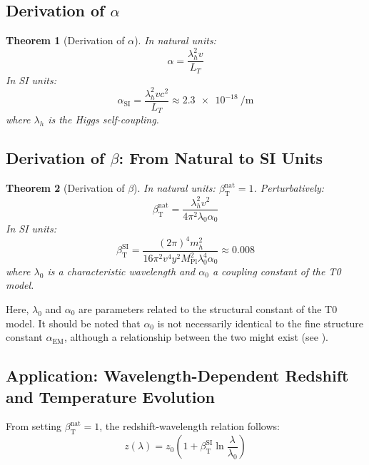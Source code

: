 \documentclass[12pt,a4paper]{article}
\newcommand{\Mpl}{M_{\text{Pl}}}
\newcommand{\alphaEM}{\alpha_{\text{EM}}}
\newcommand{\betaT}{\beta_{\text{T}}}
\newtheorem{theorem}{Theorem}[section]
\begin{document}
	\subsection{Derivation of \(\alpha\)}
	
	\begin{theorem}[Derivation of \(\alpha\)]
		In natural units:
		\begin{equation}
			\alpha = \frac{\lambda_h^2 v}{L_T}
		\end{equation}
		In SI units:
		\begin{equation}
			\alpha_{\text{SI}} = \frac{\lambda_h^2 v c^2}{L_T} \approx \SI{2.3e-18}{\per\meter}
		\end{equation}
		where \(\lambda_h\) is the Higgs self-coupling.
	\end{theorem}
	
	\subsection{Derivation of \(\beta\): From Natural to SI Units}
	
	\begin{theorem}[Derivation of \(\beta\)]
		In natural units: \(\betaT^{\text{nat}} = 1\). Perturbatively:
		\begin{equation}
			\betaT^{\text{nat}} = \frac{\lambda_h^2 v^2}{4\pi^2 \lambda_0 \alpha_0}
		\end{equation}
		In SI units:
		\begin{equation}
			\betaT^{\text{SI}} = \frac{(2\pi)^4 m_h^2}{16 \pi^2 v^4 y^2 \Mpl^2 \lambda_0^4 \alpha_0} \approx 0.008
		\end{equation}
		where \(\lambda_0\) is a characteristic wavelength and \(\alpha_0\) a coupling constant of the T0 model.
	\end{theorem}
	
	Here, \(\lambda_0\) and \(\alpha_0\) are parameters related to the structural constant of the T0 model. It should be noted that \(\alpha_0\) is not necessarily identical to the fine structure constant \(\alphaEM\), although a relationship between the two might exist (see \cite{pascher_alphabeta_2025}).
	
	\subsection{Application: Wavelength-Dependent Redshift and Temperature Evolution}
	
	From setting \(\betaT^{\text{nat}} = 1\), the redshift-wavelength relation follows:
	\begin{equation}
		z(\lambda) = z_0 \left(1 + \betaT^{\text{SI}} \ln \frac{\lambda}{\lambda_0}\right)
	\end{equation}
	
\end{document}
